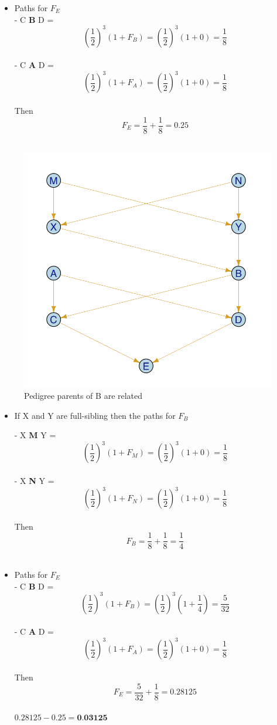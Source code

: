 \documentclass[a4paper, 11pt]{article}
\begin{document}
\begin{enumerate}
\begin{itemize}
\item Paths for $F_{E}$\\

- C \textbf{B} D = \[(\frac{1}{2})^3(1+F_B) = (\frac{1}{2})^3(1+0)=\frac{1}{8}\] \\
- C \textbf{A} D = \[(\frac{1}{2})^3(1+F_A) = (\frac{1}{2})^3(1+0)=\frac{1}{8}\] \\
Then \[F_{E} = \frac{1}{8} + \frac{1}{8} = 0.25 \] \\
\end{itemize}

\newpage

\begin{figure}[h]
    \centering
    \includegraphics[height=0.5\textwidth]{Homework4b.png}
    \caption{ Pedigree parents of B are related}
\end{figure}

\begin{itemize}

\item If X and Y are full-sibling then the paths for \(F_B\)

- X \textbf{M} Y = \[(\frac{1}{2})^3(1+F_M) = (\frac{1}{2})^3(1+0)=\frac{1}{8}\] \\
- X \textbf{N} Y = \[(\frac{1}{2})^3(1+F_N) = (\frac{1}{2})^3(1+0)=\frac{1}{8}\] \\
Then \[F_{B} = \frac{1}{8} + \frac{1}{8} = \frac{1}{4} \] \\

\item Paths for $F_{E}$\\

- C \textbf{B} D = \[(\frac{1}{2})^3(1+F_B) = (\frac{1}{2})^3(1+\frac{1}{4})=\frac{5}{32}\] \\
- C \textbf{A} D = \[(\frac{1}{2})^3(1+F_A) = (\frac{1}{2})^3(1+0)=\frac{1}{8}\] \\
Then \[F_{E} = \frac{5}{32} + \frac{1}{8} = 0.28125 \] \\

\(0.28125 - 0.25 = \textbf{0.03125}\)

\end{itemize}
\end{enumerate}
\end{document}
